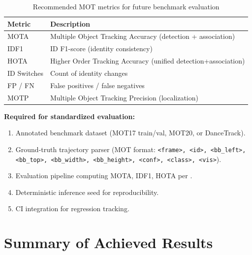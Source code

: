 \begin{table}[htbp]
\centering
\caption{Recommended MOT metrics for future benchmark evaluation}
\label{tab:future-metrics}
\begin{tabular}{@{}ll@{}}
\toprule
\textbf{Metric} & \textbf{Description} \\
\midrule
MOTA & Multiple Object Tracking Accuracy (detection + association) \\
IDF1 & ID F1-score (identity consistency) \\
HOTA & Higher Order Tracking Accuracy (unified detection+association) \\
ID Switches & Count of identity changes \\
FP / FN & False positives / false negatives \\
MOTP & Multiple Object Tracking Precision (localization) \\
\bottomrule
\end{tabular}
\end{table}

\vspace{0.3cm}

\noindent \textbf{Required for standardized evaluation:}
\begin{enumerate}
    \item Annotated benchmark dataset (MOT17 train/val, MOT20, or DanceTrack).
    \item Ground-truth trajectory parser (MOT format: \texttt{<frame>, <id>, <bb\_left>, <bb\_top>, <bb\_width>, <bb\_height>, <conf>, <class>, <vis>}).
    \item Evaluation pipeline computing MOTA, IDF1, HOTA per \cite{bernardin2008evaluating, luiten2021hota}.
    \item Deterministic inference seed for reproducibility.
    \item CI integration for regression tracking.
\end{enumerate}

\section{Summary of Achieved Results}
\label{sec:results-summary}

